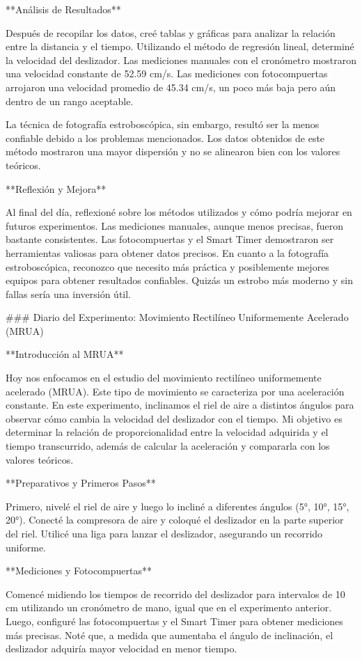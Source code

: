 \documentclass[journal]{IEEEtran}
\begin{document}
**Análisis de Resultados**

Después de recopilar los datos, creé tablas y gráficas para analizar la relación entre la distancia y el tiempo. Utilizando el método de regresión lineal, determiné la velocidad del deslizador. Las mediciones manuales con el cronómetro mostraron una velocidad constante de 52.59 cm/s. Las mediciones con fotocompuertas arrojaron una velocidad promedio de 45.34 cm/s, un poco más baja pero aún dentro de un rango aceptable.

La técnica de fotografía estroboscópica, sin embargo, resultó ser la menos confiable debido a los problemas mencionados. Los datos obtenidos de este método mostraron una mayor dispersión y no se alinearon bien con los valores teóricos.

**Reflexión y Mejora**

Al final del día, reflexioné sobre los métodos utilizados y cómo podría mejorar en futuros experimentos. Las mediciones manuales, aunque menos precisas, fueron bastante consistentes. Las fotocompuertas y el Smart Timer demostraron ser herramientas valiosas para obtener datos precisos. En cuanto a la fotografía estroboscópica, reconozco que necesito más práctica y posiblemente mejores equipos para obtener resultados confiables. Quizás un estrobo más moderno y sin fallas sería una inversión útil.

### Diario del Experimento: Movimiento Rectilíneo Uniformemente Acelerado (MRUA)

**Introducción al MRUA**

Hoy nos enfocamos en el estudio del movimiento rectilíneo uniformemente acelerado (MRUA). Este tipo de movimiento se caracteriza por una aceleración constante. En este experimento, inclinamos el riel de aire a distintos ángulos para observar cómo cambia la velocidad del deslizador con el tiempo. Mi objetivo es determinar la relación de proporcionalidad entre la velocidad adquirida y el tiempo transcurrido, además de calcular la aceleración y compararla con los valores teóricos.

**Preparativos y Primeros Pasos**

Primero, nivelé el riel de aire y luego lo incliné a diferentes ángulos (5°, 10°, 15°, 20°). Conecté la compresora de aire y coloqué el deslizador en la parte superior del riel. Utilicé una liga para lanzar el deslizador, asegurando un recorrido uniforme.

**Mediciones y Fotocompuertas**

Comencé midiendo los tiempos de recorrido del deslizador para intervalos de 10 cm utilizando un cronómetro de mano, igual que en el experimento anterior. Luego, configuré las fotocompuertas y el Smart Timer para obtener mediciones más precisas. Noté que, a medida que aumentaba el ángulo de inclinación, el deslizador adquiría mayor velocidad en menor tiempo.
\end{document}
